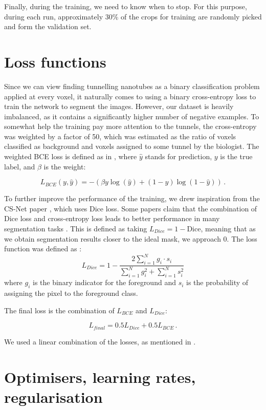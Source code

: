 \documentclass[
  digital,     %
  oneside,     %
  nosansbold,  %
  nocolorbold, %
  lof,         %
  lot,         %
]{fithesis4}
\begin{document}
Finally, during the training, we need to know when to stop. For this purpose, during each run, approximately 30\% of the crops for training are randomly picked and form the validation set.

\section{Loss functions}
Since we can view finding tunnelling nanotubes as a binary classification problem applied at every voxel, it naturally comes to using a binary cross-entropy loss to train the network to segment the images. However, our dataset is heavily imbalanced, as it contains a significantly higher number of negative examples. To somewhat help the training pay more attention to the tunnels, the cross-entropy was weighted by a factor of 50, which was estimated as the ratio of voxels classified as background and voxels assigned to some tunnel by the biologist. The weighted BCE loss is defined as in \parencite{Jadon2020loss,PyTorchBCE}, where $\hat{y}$ stands for prediction, $y$ is the true label, and $\beta$ is the weight:

\[ L_{BCE}(y, \hat{y}) = -(\beta y \log(\hat{y}) + (1-y)\log(1-\hat{y})) \, .\]

To further improve the performance of the training, we drew inspiration from the CS-Net paper \parencite{Mou2021}, which uses Dice loss. Some papers claim that the combination of Dice loss and cross-entropy loss leads to better performance in many segmentation tasks \parencite{ma2020segmentationlossodyssey}. This is defined as taking $L_{Dice} = 1 - \text{Dice}$, meaning that as we obtain segmentation results closer to the ideal mask, we approach 0. The loss function was defined as \parencite{ma2020segmentationlossodyssey}:
\[ L_{Dice}=1-\frac{2\sum_{i=1}^{N}{g_i \cdot s_i}}{\sum_{i=1}^{N}{g_i^2}+\sum_{i=1}^{N}{s_i^2}} \]
where $g_i$ is the binary indicator for the foreground and $s_i$ is the probability of assigning the pixel to the foreground class.

The final loss is the combination of $L_{BCE}$ and $L_{Dice}$:

\[ L_{final} = 0.5 L_{Dice} + 0.5 L_{BCE} \, .\]

We used a linear combination of the losses, as mentioned in \parencite{ma2020segmentationlossodyssey}.

\section{Optimisers, learning rates, regularisation}
\label{sec:optimisers}
\end{document}
